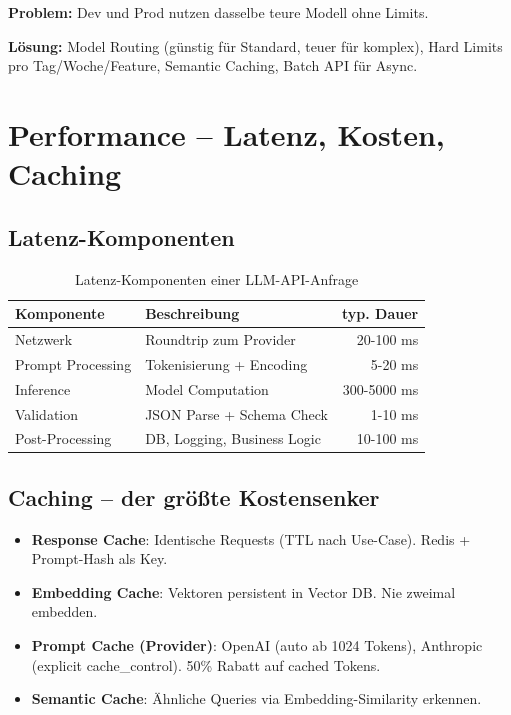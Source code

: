 \textbf{Problem:} Dev und Prod nutzen dasselbe teure Modell ohne Limits.

\textbf{Lösung:} Model Routing (günstig für Standard, teuer für komplex), Hard Limits pro Tag/Woche/Feature, Semantic Caching, Batch API für Async.

\section{Performance -- Latenz, Kosten, Caching}

\subsection{Latenz-Komponenten}

\begin{table}[H]
\centering
\begin{tabularx}{\linewidth}{lXr}
\toprule
\textbf{Komponente} & \textbf{Beschreibung} & \textbf{typ. Dauer} \\
\midrule
Netzwerk & Roundtrip zum Provider & 20-100 ms \\
Prompt Processing & Tokenisierung + Encoding & 5-20 ms \\
Inference & Model Computation & 300-5000 ms \\
Validation & JSON Parse + Schema Check & 1-10 ms \\
Post-Processing & DB, Logging, Business Logic & 10-100 ms \\
\bottomrule
\end{tabularx}
\caption{Latenz-Komponenten einer LLM-API-Anfrage}
\label{tab:latenz}
\end{table}


\subsection{Caching -- der größte Kostensenker}

\begin{itemize}[leftmargin=*]
    \item \textbf{Response Cache}: Identische Requests (TTL nach Use-Case). Redis + Prompt-Hash als Key.
    \item \textbf{Embedding Cache}: Vektoren persistent in Vector DB. Nie zweimal embedden.
    \item \textbf{Prompt Cache (Provider)}: OpenAI (auto ab 1024 Tokens), Anthropic (explicit cache\_control). 50\% Rabatt auf cached Tokens.
    \item \textbf{Semantic Cache}: Ähnliche Queries via Embedding-Similarity erkennen. 
\end{itemize}

